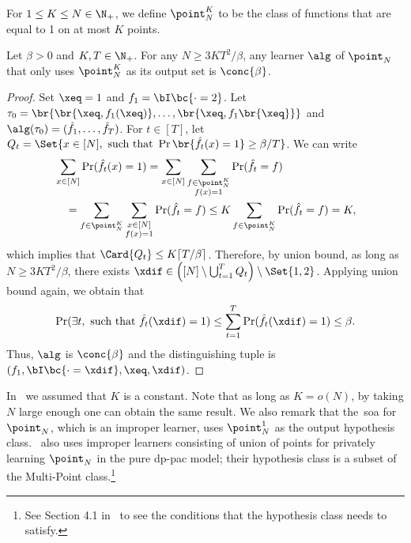 \begin{definition}\label{defn:multi-point}
     For \(1 \leq K \leq N \in \N_+\), we define \(
        \point^K_N\)
    to be the class of functions that are equal to 1 on at most \(K\) points.
\end{definition}
\begin{lemma}\label{lem:example-conc-learners}
    Let \(\beta > 0\) and \(K, T \in \N_+\). 
    For any \(N \geq 3K T^2 / \beta\), any learner \(\alg\) of \(\point_N\) that only uses \(\point^K_N\) as its output set is \(\conc{\beta}\).
\end{lemma}
\begin{proof}
    Set \(\xeq = 1\) and \(f_1 = \bI\bc{ \cdot = 2}\).
    Let \(\tau_0 = \br{\br{\xeq, f_1(\xeq)}, \ldots, \br{\xeq, f_1\br{\xeq}}}\) and
    \(\alg(\tau_0) = (\hat f_1, \ldots, \hat f_T)\).
    For \(t \in [T]\), let \(
        Q_t = \Set{x \in [N], \text{ such that } \Pr\br{\hat f_t(x) = 1} \geq \beta / T}\).
    We can write
    \begin{equation}
    \begin{aligned}
        &\sum_{x \in [N]} \Pr(\hat f_t(x) = 1) = \sum_{x \in [N]} \sum_{\substack{f \in \point^K_N \\ f(x) = 1}} \Pr(\hat f_t = f)
        \\
        &\quad = \sum_{f \in \point^K_N} \sum_{\substack{x \in [N] \\ f(x) = 1}} \Pr(\hat f_t = f) \leq K \sum_{f \in \point^K_N} \Pr(\hat f_t = f) = K,
    \end{aligned}
    \end{equation}
    which implies that \(\Card{Q_t} \leq K \lceil T / \beta \rceil\).
    Therefore, by union bound, as long as \(N \geq 3K T^2 / \beta\), there exists \(\xdif \in \left([N] \setminus \bigcup_{t=1}^T Q_t\right) \setminus \Set{1, 2}\).
    Applying union bound again, we obtain that 
    \begin{equation}
        \Pr(\exists t, \text{ such that } \hat f_t(\xdif) = 1) \leq \sum_{t=1}^T \Pr(\hat f_t(\xdif) = 1) \leq \beta.
    \end{equation}
    Thus, \(\alg\) is \(\conc{\beta}\) and the distinguishing tuple is \((f_1, \bI\bc{ \cdot = \xdif}, \xeq, \xdif)\).
\end{proof}

In~ we assumed that \(K\) is a constant. Note that as long as \(K = o(N)\), by taking \(N\) large enough one can obtain the same result. We also remark that the~\Gls{soa} for \(\point_N\), which is an improper learner, uses \(\point_N^1\) as the output hypothesis class.~\citet{beimel2014bounds} also uses improper learners consisting of union of points for privately learning \(\point_N\) in the pure \Gls{dp}-\Gls{pac} model; their hypothesis class is a subset of the Multi-Point class.\footnote{ See Section 4.1 in~\citet{beimel2014bounds} to see the conditions that the hypothesis class needs to satisfy.} 

